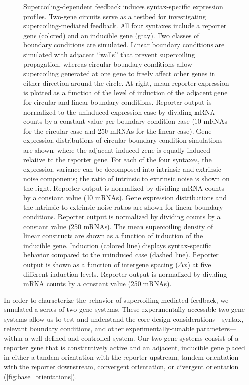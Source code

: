 \documentclass[11pt]{article}
\begin{document}
\begin{figure}
    \ContinuedFloat
    \caption{Supercoiling-dependent feedback induces syntax-specific expression profiles.
         Two-gene circuits serve as a testbed for investigating supercoiling-mediated feedback. All four syntaxes include a reporter gene (colored) and an inducible gene (gray).
         Two classes of boundary conditions are simulated. Linear boundary conditions are simulated with adjacent ``walls'' that prevent supercoiling propagation, whereas circular boundary conditions allow supercoiling generated at one gene to freely affect other genes in either direction around the circle. At right, mean reporter expression is plotted as a function of the level of induction of the adjacent gene for circular and linear boundary conditions. Reporter output is normalized to the uninduced expression case by dividing mRNA counts by a constant value per boundary condition case (10 mRNAs for the circular case and 250 mRNAs for the linear case).
         Gene expression distributions of circular-boundary-condition simulations are shown, where the adjacent induced gene is equally induced relative to the reporter gene. For each of the four syntaxes, the expression variance can be decomposed into intrinsic and extrinsic noise components; the ratio of intrinsic to extrinsic noise is shown on the right. Reporter output is normalized by dividing mRNA counts by a constant value (10 mRNAs).
         Gene expression distributions and the intrinsic to extrinsic noise ratios are shown for linear boundary conditions. Reporter output is normalized by dividing counts by a constant value (250 mRNAs).
         The mean supercoiling density of linear constructs are shown as a function of induction of the inducible gene. Induction (colored line) displays syntax-specific behavior compared to the uninduced case (dashed line).
         Reporter output is shown as a function of intergene spacing (\(\Delta x\)) at five different induction levels. Reporter output is normalized by dividing mRNA counts by a constant value (250 mRNAs).
    } \label{fig:top:orientation_bc_behavior}
\end{figure}

In order to characterize the behavior of supercoiling-mediated feedback, we simulated a series of two-gene systems. These experimentally accessible two-gene systems allow us to test and understand the core design considerations---syntax, relevant boundary conditions, and other experimentally-tunable parameters---within a well-defined and controlled system. Our two-gene systems consist of a reporter gene that is constitutively active and an adjacent, inducible gene placed in either a tandem orientation with the reporter upstream, tandem orientation with the reporter downstream, convergent orientation, or divergent orientation (\cref{fig:base_orientations}).
\end{document}
